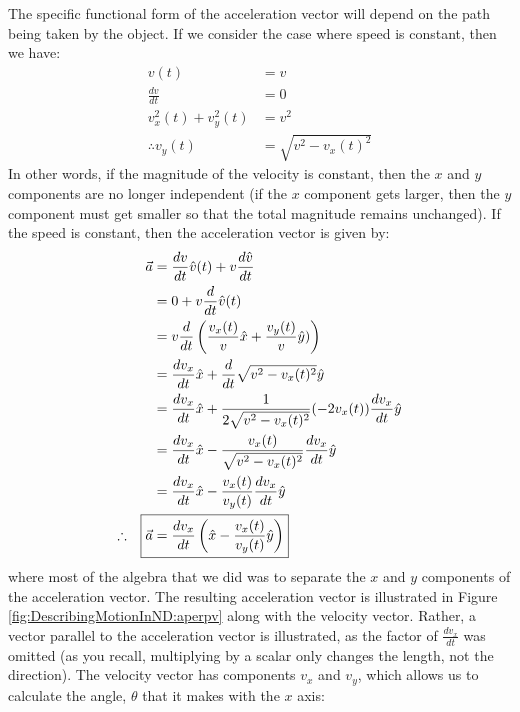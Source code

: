 The specific functional form of the acceleration vector will depend on the path being taken by the object. If we consider the case where speed is constant, then we have:
\begin{align*}
v(t) &= v \\
\frac{dv}{dt}&=0\\
v_x^2(t)+v_y^2(t) &=v^2 \\
\therefore v_y(t)&=\sqrt{v^2-v_x(t)^2}
\end{align*}
In other words, if the magnitude of the velocity is constant, then the $x$ and $y$ components are no longer independent (if the $x$ component gets larger, then the $y$ component must get smaller so that the total magnitude remains unchanged). If the speed is constant, then the acceleration vector is given by:
\begin{align}
\label{eqn:DescribingMotionInND:vecaconstv}
\vec a&=\frac{dv}{dt}\hat v(t)+v\frac{d\hat v}{dt}\nonumber\\
&=0 + v\frac{d}{dt}\hat v(t)\nonumber\\
&=v\frac{d}{dt}\left(\frac{v_x(t)}{v}\hat x+\frac{v_y(t)}{v}\hat y   )\right)\nonumber\\
&=\frac{dv_x}{dt}\hat x + \frac{d}{dt}\sqrt{v^2-v_x(t)^2}\hat y\nonumber\\
&=\frac{dv_x}{dt}\hat x + \frac{1}{2\sqrt{v^2-v_x(t)^2}}(-2v_x(t))\frac{dv_x}{dt}\hat y\nonumber\\
&=\frac{dv_x}{dt}\hat x - \frac{v_x(t)}{\sqrt{v^2-v_x(t)^2}}\frac{dv_x}{dt}\hat y\nonumber\\
&=\frac{dv_x}{dt}\hat x - \frac{v_x(t)}{v_y(t)}\frac{dv_x}{dt}\hat y\nonumber\\
\therefore\quad\Aboxed{\vec a&=\frac{dv_x}{dt} \left(\hat x - \frac{v_x(t)}{v_y(t)}\hat y\right)}
\end{align}
where most of the algebra that we did was to separate the $x$ and $y$ components of the acceleration vector. The resulting acceleration vector is illustrated in Figure \ref{fig:DescribingMotionInND:aperpv} along with the velocity vector. Rather, a vector parallel to the acceleration vector is illustrated, as the factor of $\frac{dv_x}{dt}$ was omitted (as you recall, multiplying by a scalar only changes the length, not the direction). The velocity vector has components $v_x$ and $v_y$, which allows us to calculate the angle, $\theta$ that it makes with the $x$ axis:
